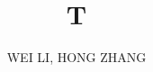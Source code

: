 \documentclass{llncs}
\begin{document}
\title{T}
\author{WEI LI, HONG ZHANG}
\maketitle
\end{document}

